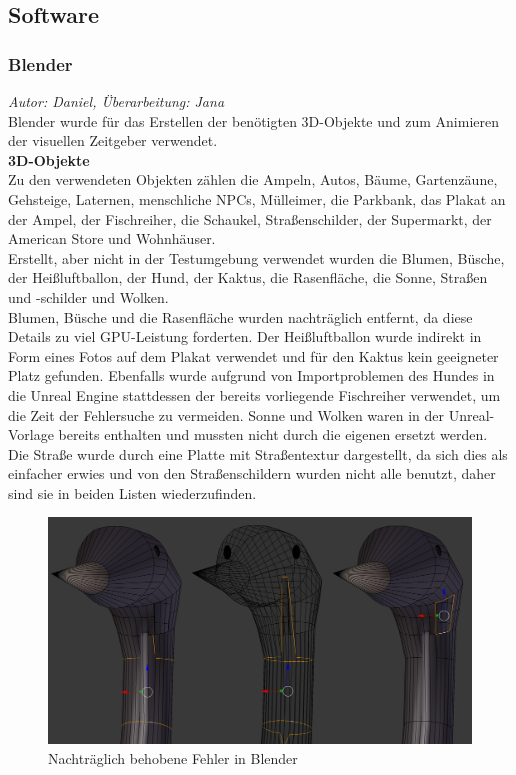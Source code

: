 \documentclass{Bericht}
\begin{document}
\subsection{Software}
\label{sec:software}
\subsubsection{Blender}
\textit{Autor: Daniel, Überarbeitung: Jana}\\
Blender wurde für das Erstellen der benötigten 3D-Objekte und zum Animieren der visuellen Zeitgeber verwendet.\\

\textbf{3D-Objekte}\\
Zu den verwendeten Objekten zählen die Ampeln, Autos, Bäume, Gartenzäune, Gehsteige, Laternen, menschliche NPCs, Mülleimer, die Parkbank, das Plakat an der Ampel, der Fischreiher, die Schaukel, Straßenschilder, der Supermarkt, der American Store und Wohnhäuser.\\
Erstellt, aber nicht in der Testumgebung verwendet wurden die Blumen, Büsche, der Heißluftballon, der Hund, der Kaktus, die Rasenfläche, die Sonne, Straßen und -schilder und Wolken.\\
		Blumen, Büsche und die Rasenfläche wurden nachträglich entfernt, da diese Details zu viel GPU-Leistung forderten. Der Heißluftballon wurde indirekt in Form eines Fotos auf dem Plakat verwendet und für den Kaktus kein geeigneter Platz gefunden. Ebenfalls wurde aufgrund von Importproblemen des Hundes in die Unreal Engine stattdessen der bereits vorliegende Fischreiher verwendet, um die Zeit der Fehlersuche zu vermeiden.
 		Sonne und Wolken waren in der Unreal-Vorlage bereits enthalten und mussten nicht durch die eigenen ersetzt werden. 
		Die Straße wurde durch eine Platte mit Straßentextur dargestellt, da sich dies als einfacher erwies und von den Straßenschildern wurden nicht alle benutzt, daher sind sie in beiden Listen wiederzufinden.\\

		\begin{figure}[H] %
			\centering
			\includegraphics[height=\textheight, width=\linewidth, keepaspectratio, angle=0]{../Bilder/Heron_Problem.png} %
			\caption{Nachträglich behobene Fehler in Blender}
			\label{img:heron-error}
		\end{figure}
\end{document}
